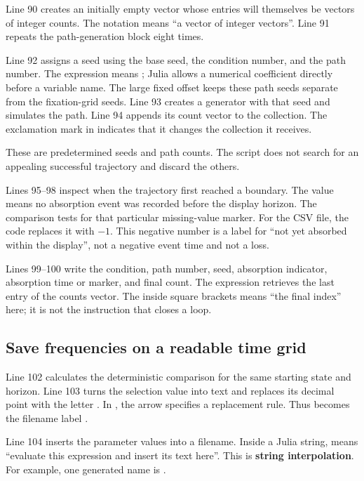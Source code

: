 Line 90 creates an initially empty vector whose entries will themselves be
vectors of integer counts. The notation  means
``a vector of integer vectors''. Line 91 repeats the path-generation block
eight times.

Line 92 assigns a seed using the base seed, the condition number, and the
path number. The expression  means
; Julia allows a numerical coefficient directly
before a variable name. The large fixed offset keeps these path seeds
separate from the fixation-grid seeds. Line 93 creates a generator with that
seed and simulates the path. Line 94 appends its count vector to the
collection. The exclamation mark in  indicates that it changes
the collection it receives.

These are predetermined seeds and path counts. The script does not search
for an appealing successful trajectory and discard the others.

Lines 95--98 inspect when the trajectory first reached a boundary.
The value  means no absorption event was recorded before
the display horizon. The comparison  tests for that
particular missing-value marker. For the CSV file, the code replaces it
with \(-1\). This negative number is a label for ``not yet absorbed within
the display'', not a negative event time and not a loss.

Lines 99--100 write the condition, path number, seed, absorption indicator,
absorption time or marker, and final count. The expression
 retrieves the last entry of the counts vector.
The  inside square brackets means ``the final index'' here; it
is not the instruction that closes a loop.

\subsection{Save frequencies on a readable time grid}

Line 102 calculates the deterministic comparison for the same starting
state and horizon. Line 103 turns the selection value into text and replaces
its decimal point with the letter . In , the
arrow specifies a replacement rule. Thus  becomes the filename
label .

Line 104 inserts the parameter values into a filename. Inside a Julia
string,  means ``evaluate this expression and insert its text
here''. This is \textbf{string interpolation}. For example, one generated
name is .

